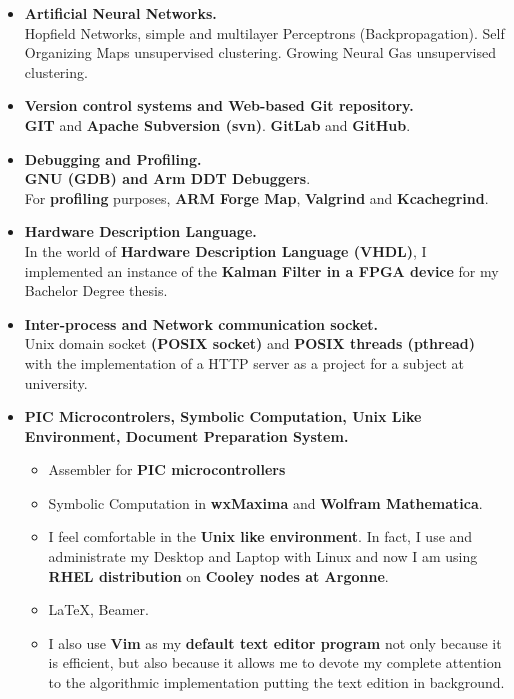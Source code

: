 \documentclass{article}
\begin{document}
\begin{itemize}
	\item {\bf Artificial Neural Networks.}\\
Hopfield Networks, simple and multilayer Perceptrons (Backpropagation).
Self Organizing Maps unsupervised clustering. Growing Neural Gas unsupervised clustering.

	\item {\bf Version control systems and Web-based Git repository.}\\
\textbf{GIT} and \textbf{Apache Subversion (svn)}.
\textbf{GitLab} and \textbf{GitHub}.

	\item {\bf Debugging and Profiling.}\\
\textbf{GNU (GDB) and Arm DDT Debuggers}.\\
For \textbf{profiling} purposes,
\textbf{ARM Forge Map}, \textbf{Valgrind} and \textbf{Kcachegrind}.

	\item {\bf Hardware Description Language.}\\
In the world of \textbf{Hardware Description Language (VHDL)},
I implemented an instance of the \textbf{Kalman Filter in a FPGA device}
for my Bachelor Degree thesis.
	
	\item {\bf Inter-process and Network communication socket.}\\
Unix domain socket \textbf{(POSIX socket)} and \textbf{POSIX threads (pthread)} with the implementation of a HTTP server as
a project for a subject at university.

	\item {\bf PIC Microcontrolers, Symbolic Computation, Unix Like Environment, Document Preparation System.}
	\begin{itemize}
		\item Assembler for \textbf{PIC microcontrollers}
		\item Symbolic Computation in \textbf{wxMaxima} and \textbf{Wolfram Mathematica}.
		\item I feel comfortable in the \textbf{Unix like environment}. In fact, I use and administrate
		my Desktop and Laptop with Linux and now I am using \textbf{RHEL distribution} on
		\textbf{Cooley nodes at Argonne}.
		\item \LaTeX, Beamer.
		\item I also use \textbf{Vim} as my \textbf{default text editor program}
		not only because it is efficient, but also because it allows me to devote my complete
		attention to the algorithmic implementation putting the text edition
		in background.
	\end{itemize}
	
\end{itemize}
\end{document}
